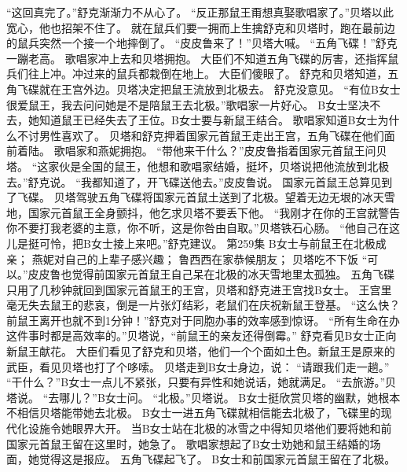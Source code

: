\documentclass[a4paper,12pt,UTF8,twoside]{ctexbook}
\begin{document}
        “这回真完了。”舒克渐渐力不从心了。  
        “反正那鼠王甭想真娶歌唱家了。”贝塔以此宽心，他也招架不住了。  
        就在鼠兵们要一拥而上生擒舒克和贝塔时，跑在最前边的鼠兵突然一个接一个地摔倒了。  
        “皮皮鲁来了！”贝塔大喊。  
        “五角飞碟！”舒克一蹦老高。  
        歌唱家冲上去和贝塔拥抱。  
        大臣们不知道五角飞碟的厉害，还指挥鼠兵们往上冲。冲过来的鼠兵都栽倒在地上。  
        大臣们傻眼了。  
        舒克和贝塔知道，五角飞碟就在王宫外边。贝塔决定把鼠王流放到北极去。  
        舒克没意见。  
        “有位B女士很爱鼠王，我去问问她是不是陪鼠王去北极。”歌唱家一片好心。  
        B女士坚决不去，她知道鼠王已经失去了王位。B女士要与新鼠王结合。  
        歌唱家知道B女士为什么不讨男性喜欢了。  
        贝塔和舒克押着国家元首鼠王走出王宫，五角飞碟在他们面前着陆。  
        歌唱家和燕妮拥抱。  
        “带他来干什么？”皮皮鲁指着国家元首鼠王问贝塔。  
        “这家伙是全国的鼠王，他想和歌唱家结婚，挺坏，贝塔说把他流放到北极去。”舒克说。  
        “我都知道了，开飞碟送他去。”皮皮鲁说。  
        国家元首鼠王总算见到了飞碟。  
        贝塔驾驶五角飞碟将国家元首鼠土送到了北极。望着无边无垠的冰天雪地，国家元首鼠王全身颤抖，他乞求贝塔不要丢下他。  
        “我刚才在你的王宫就警告你不要打我老婆的主意，你不听，这是你咎由自取。”贝塔铁石心肠。  
        “他自己在这儿是挺可怜，把B女士接上来吧。”舒克建议。          第259集  
        B女士与前鼠王在北极成亲；  
        燕妮对自己的上辈子感兴趣；  
        鲁西西在家恭候朋友；  
        贝塔吃不下饭    
        “可以。”皮皮鲁也觉得前国家元首鼠王自己呆在北极的冰天雪地里太孤独。  
        五角飞碟只用了几秒钟就回到国家元首鼠王的王宫，贝塔和舒克进王宫找B女士。  
        王宫里毫无失去鼠王的悲哀，倒是一片张灯结彩，老鼠们在庆祝新鼠王登基。  
        “这么快？前鼠王离开也就不到1分钟！”舒克对于同胞办事的效率感到惊讶。  
        “所有生命在办这件事时都是高效率的。”贝塔说，“前鼠王的亲友还得倒霉。”  
        舒克看见B女士正向新鼠王献花。        
        大臣们看见了舒克和贝塔，他们一个个面如土色。新鼠王是原来的武臣，看见贝塔也打了个哆嗦。  
        贝塔走到B女士身边，说：  
        “请跟我们走一趟。”  
        “干什么？”B女士一点儿不紧张，只要有异性和她说话，她就满足。  
        “去旅游。”贝塔说。  
        “去哪儿？”B女士问。  
        “北极。”贝塔说。  
        B女士挺欣赏贝塔的幽默，她根本不相信贝塔能带她去北极。  
        B女士一进五角飞碟就相信能去北极了，飞碟里的现代化设施令她眼界大开。  
        当B女士站在北极的冰雪之中得知贝塔他们要将她和前国家元首鼠王留在这里时，她急了。  
        歌唱家想起了B女士劝她和鼠王结婚的场面，她觉得这是报应。  
        五角飞碟起飞了。  
        B女士和前国家元首鼠王留在了北极。  
\end{document}
